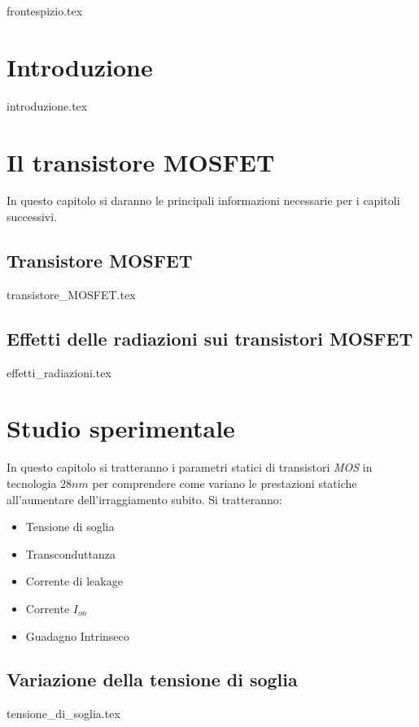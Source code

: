 \documentclass[
	a4paper,
	cleardoublepage=empty,
	headings=twolinechapter,
	numbers=autoenddot,
]{scrbook}
\begin{document}
\frontmatter

{frontespizio.tex}

\tableofcontents

\chapter*{Introduzione}
{introduzione.tex}

\mainmatter

\chapter{Il transistore MOSFET}
In questo capitolo si daranno le principali informazioni necessarie per i capitoli successivi.
\section{Transistore MOSFET}
{transistore_MOSFET.tex}

\section{Effetti delle radiazioni sui transistori MOSFET}
{effetti_radiazioni.tex}


\chapter{Studio sperimentale}
In questo capitolo si tratteranno i parametri statici di transistori \emph{MOS} in tecnologia $28 nm$ per comprendere come variano le prestazioni statiche all'aumentare dell'irraggiamento subito. Si tratteranno:
\begin{itemize}
  \item Tensione di soglia
  \item Transconduttanza
  \item Corrente di leakage
  \item Corrente $I_{on}$
  \item Guadagno Intrinseco
\end{itemize}
\section{Variazione della tensione di soglia}
{tensione_di_soglia.tex}
\end{document}
